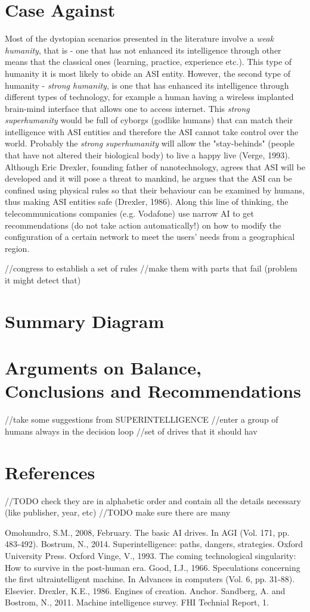 \documentclass[11pt]{article}
\begin{document}
\section*{Case Against}
	Most of the dystopian scenarios presented in the literature involve a \textit{weak humanity}, that is - one that has not enhanced its intelligence through other means that the classical ones (learning, practice, experience etc.). This type of humanity it is most likely to obide an ASI entity. However, the second type of humanity - \textit{strong humanity}, is one that has enhanced its intelligence through different types of technology, for example a human having a wireless implanted brain-mind interface that allows one to access internet. This \textit{strong superhumanity} would be full of cyborgs (godlike humans) that can match their intelligence with ASI entities and therefore the ASI cannot take control over the world. Probably the \textit{strong superhumanity} will allow the  "stay-behinds" (people that have not altered their biological body) to live a happy live (Verge, 1993). \\

Although Eric Drexler, founding father of nanotechnology, agrees that ASI will be developed and it will pose a threat to mankind, he argues that the ASI can be confined using physical rules so that their behaviour can be examined by humans, thus making ASI entities safe (Drexler, 1986). Along this line of thinking, the telecommunications companies (e.g. Vodafone) use narrow AI to get recommendations (do not take action automatically!) on how to modify the configuration of a certain network to meet the users' needs from a geographical region. 

//congress to establish a set of rules
//make them with parts that fail (problem it might detect that)

\section*{Summary Diagram}

\section*{Arguments on Balance, Conclusions and Recommendations}
//take some suggestions from SUPERINTELLIGENCE
//enter a group of humans always in the decision loop
//set of drives that it should hav
\section{References}
//TODO check they are in alphabetic order and contain all the details necessary (like publisher, year, etc)
//TODO make sure there are many

Omohundro, S.M., 2008, February. The basic AI drives. In AGI (Vol. 171, pp. 483-492).
Bostrum, N., 2014. Superintelligence: paths, dangers, strategies. Oxford University Press. Oxford
Vinge, V., 1993. The coming technological singularity: How to survive in the post-human era.
Good, I.J., 1966. Speculations concerning the first ultraintelligent machine. In Advances in computers (Vol. 6, pp. 31-88). Elsevier.
Drexler, K.E., 1986. Engines of creation. Anchor.
Sandberg, A. and Bostrom, N., 2011. Machine intelligence survey. FHI Technial Report, 1.
\end{document}
